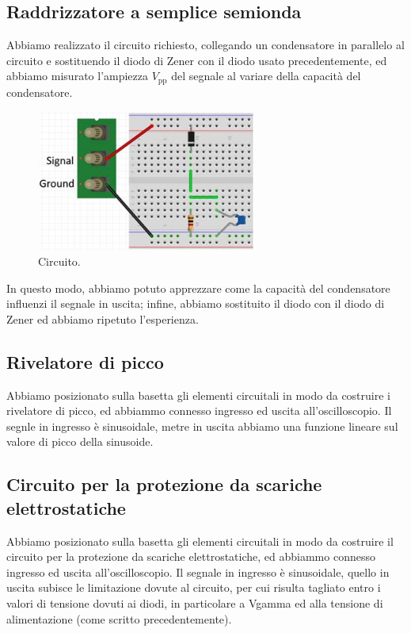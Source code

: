 \documentclass[a4paper]{article}
\begin{document}
		\subsection{Raddrizzatore a semplice semionda}
			Abbiamo realizzato il circuito richiesto, collegando un condensatore in parallelo al circuito e sostituendo il diodo di Zener con il diodo usato precedentemente, ed abbiamo misurato l'ampiezza $ V_{\mathrm{pp}} $ del segnale al variare della capacità del condensatore.
			\begin{figure}[h!]
				\centering
				\includegraphics[scale=0.7]{circuitoRaddrizzatoreASempliceSemionda}
				\caption{Circuito.}
				\label{fig:circuitoRaddrizzatoreASempliceSemionda}
			\end{figure}
			\newline
			In questo modo, abbiamo potuto apprezzare come la capacità del condensatore influenzi il segnale in uscita; infine, abbiamo sostituito il diodo con il diodo di Zener ed abbiamo ripetuto l'esperienza.
		\subsection{Rivelatore di picco}
			Abbiamo posizionato sulla basetta gli elementi circuitali in modo da costruire i rivelatore di picco, ed abbiammo connesso ingresso ed uscita all'oscilloscopio.
			Il segnle in ingresso è sinusoidale, metre in uscita abbiamo una funzione lineare sul valore di picco della sinusoide.
		\subsection{Circuito per la protezione da scariche elettrostatiche}
			Abbiamo posizionato sulla basetta gli elementi circuitali in modo da costruire il circuito per la protezione da scariche elettrostatiche, ed abbiammo connesso ingresso ed uscita all'oscilloscopio.
			Il segnale in ingresso è sinusoidale, quello in uscita subisce le limitazione dovute al circuito, per cui risulta tagliato entro i valori di tensione dovuti ai diodi, in particolare a Vgamma ed alla tensione di alimentazione (come scritto precedentemente).
\end{document}
